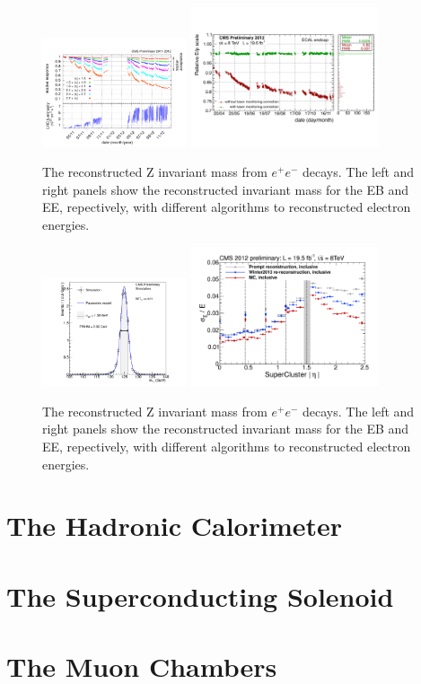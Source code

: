 \begin{figure}
 \centering
\includegraphics[width=0.38\textwidth]{CMS_DetectorFigures/ECAL_RelativeResponse1.pdf}
\includegraphics[width=0.49\textwidth]{CMS_DetectorFigures/ECAL_RelativeResponse2.pdf}
\caption{The reconstructed Z invariant mass from $e^{+}e^{-}$
  decays. The left and right panels show the reconstructed invariant mass for
  the EB and EE, repectively, with different algorithms to reconstructed electron energies.\label{fig:ECAL_response}}
\end{figure}

\begin{figure}
 \centering
\includegraphics[width=0.38\textwidth]{CMS_DetectorFigures/ECAL_HiggsMassRes.pdf}
\includegraphics[width=0.49\textwidth]{CMS_DetectorFigures/ECAL_EnergyResolution_Eta.pdf}
\caption{The reconstructed Z invariant mass from $e^{+}e^{-}$
  decays. The left and right panels show the reconstructed invariant mass for
  the EB and EE, repectively, with different algorithms to reconstructed electron energies.\label{fig:ECAL_response}}
\end{figure}
\section{The Hadronic Calorimeter}
\section{The Superconducting Solenoid}
\section{The Muon Chambers}